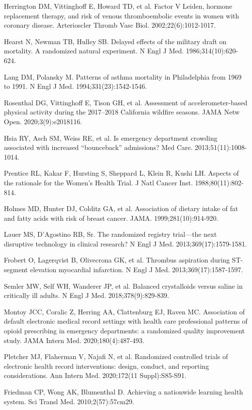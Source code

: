 \begin{references}
\item Herrington DM, Vittinghoff E, Howard TD, et al. Factor V Leiden, hormone replacement therapy, and risk of venous thromboembolic events in women with coronary disease. Arterioscler Thromb Vasc Biol. 2002;22(6):1012-1017.
\item Hearst N, Newman TB, Hulley SB. Delayed effects of the military draft on mortality. A randomized natural experiment. N Engl J Med. 1986;314(10):620-624.
\item Lang DM, Polansky M. Patterns of asthma mortality in Philadelphia from 1969 to 1991. N Engl J Med. 1994;331(23):1542-1546.
\item Rosenthal DG, Vittinghoff E, Tison GH, et al. Assessment of accelerometer-based physical activity during the 2017–2018 California wildfire seasons. JAMA Netw Open. 2020;3(9):e2018116.
\item Hsia RY, Asch SM, Weiss RE, et al. Is emergency department crowding associated with increased “bounceback” admissions? Med Care. 2013;51(11):1008-1014.
\item Prentice RL, Kakar F, Hursting S, Sheppard L, Klein R, Kushi LH. Aspects of the rationale for the Women’s Health Trial. J Natl Cancer Inst. 1988;80(11):802-814.
\item Holmes MD, Hunter DJ, Colditz GA, et al. Association of dietary intake of fat and fatty acids with risk of breast cancer. JAMA. 1999;281(10):914-920.
\item Lauer MS, D’Agostino RB, Sr. The randomized registry trial—the next disruptive technology in clinical research? N Engl J Med. 2013;369(17):1579-1581.
\item Frobert O, Lagerqvist B, Olivecrona GK, et al. Thrombus aspiration during ST-segment elevation myocardial infarction. N Engl J Med. 2013;369(17):1587-1597.
\item Semler MW, Self WH, Wanderer JP, et al. Balanced crystalloids versus saline in critically ill adults. N Engl J Med. 2018;378(9):829-839.
\item Montoy JCC, Coralic Z, Herring AA, Clattenburg EJ, Raven MC. Association of default electronic medical record settings with health care professional patterns of opioid prescribing in emergency departments: a randomized quality improvement study. JAMA Intern Med. 2020;180(4):487-493.
\item Pletcher MJ, Flaherman V, Najafi N, et al. Randomized controlled trials of electronic health record interventions: design, conduct, and reporting considerations. Ann Intern Med. 2020;172(11 Suppl):S85-S91.
\item Friedman CP, Wong AK, Blumenthal D. Achieving a nationwide learning health system. Sci Transl Med. 2010;2(57):57cm29.
\end{references}

